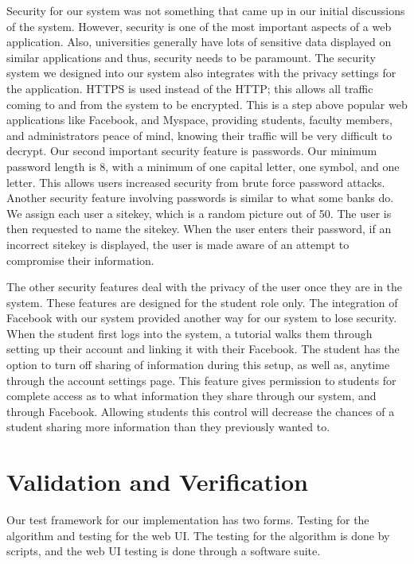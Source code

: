 \documentclass[12pt,article]{memoir}
\begin{document}
Security for our system was not something that came up in our initial discussions of the system. However, security is one of the most important aspects of a web application. Also, universities generally have lots of sensitive data displayed on similar applications and thus, security needs to be paramount. The security system we designed into our system also integrates with the privacy settings for the application. HTTPS is used instead of the HTTP; this allows all traffic coming to and from the system to be encrypted. This is a step above popular web applications like Facebook, and Myspace, providing students, faculty members, and administrators peace of mind, knowing their traffic will be very difficult to decrypt. Our second important security feature is passwords. Our minimum password length is 8, with a minimum of one capital letter, one symbol, and one letter. This allows users increased security from brute force password attacks. Another security feature involving passwords is similar to what some banks do. We assign each user a sitekey, which is a random picture out of 50. The user is then requested to name the sitekey. When the user enters their password, if an incorrect sitekey is displayed, the user is made aware of an attempt to compromise their information. 

The other security features deal with the privacy of the user once they are in the system. These features are designed for the student role only. The integration of Facebook with our system provided another way for our system to lose security. When the student first logs into the system, a tutorial walks them through setting up their account and linking it with their Facebook. The student has the option to turn off sharing of information during this setup, as well as, anytime through the account settings page. This feature gives permission to students for complete access as to what information they share through our system, and through Facebook. Allowing students this control will decrease the chances of a student sharing more information than they previously wanted to.

\chapter{Validation and Verification} %
Our test framework for our implementation has two forms. Testing for the algorithm and testing for the web UI. The testing for the algorithm is done by scripts, and the web UI testing is done through a software suite.
\end{document}
